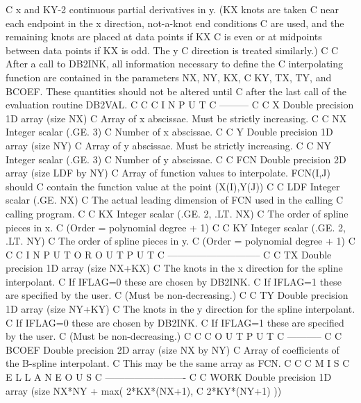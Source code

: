 \documentclass[11pt,twoside,nolof]{starlink}
\begin{document}
\begin{terminalv}
C   x and KY-2 continuous partial derivatives in y. (KX knots are taken
C   near each endpoint in the x direction,  not-a-knot  end  conditions
C   are used, and the remaining knots are placed at data points  if  KX
C   is even or at midpoints between data points if KX  is  odd.  The  y
C   direction is treated similarly.)
C
C   After a call to DB2INK, all information  necessary  to  define  the
C   interpolating function are contained in the parameters NX, NY,  KX,
C   KY, TX, TY, and BCOEF. These quantities should not be altered until
C   after the last call of the evaluation routine DB2VAL.
C
C
C   I N P U T
C   ---------
C
C   X       Double precision 1D array (size NX)
C           Array of x abscissae. Must be strictly increasing.
C
C   NX      Integer scalar (.GE. 3)
C           Number of x abscissae.
C
C   Y       Double precision 1D array (size NY)
C           Array of y abscissae. Must be strictly increasing.
C
C   NY      Integer scalar (.GE. 3)
C           Number of y abscissae.
C
C   FCN     Double precision 2D array (size LDF by NY)
C           Array of function values to interpolate. FCN(I,J) should
C           contain the function value at the point (X(I),Y(J))
C
C   LDF     Integer scalar (.GE. NX)
C           The actual leading dimension of FCN used in the calling
C           calling program.
C
C   KX      Integer scalar (.GE. 2, .LT. NX)
C           The order of spline pieces in x.
C           (Order = polynomial degree + 1)
C
C   KY      Integer scalar (.GE. 2, .LT. NY)
C           The order of spline pieces in y.
C           (Order = polynomial degree + 1)
C
C
C   I N P U T   O R   O U T P U T
C   -----------------------------
C
C   TX      Double precision 1D array (size NX+KX)
C           The knots in the x direction for the spline interpolant.
C           If IFLAG=0 these are chosen by DB2INK.
C           If IFLAG=1 these are specified by the user.
C                      (Must be non-decreasing.)
C
C   TY      Double precision 1D array (size NY+KY)
C           The knots in the y direction for the spline interpolant.
C           If IFLAG=0 these are chosen by DB2INK.
C           If IFLAG=1 these are specified by the user.
C                      (Must be non-decreasing.)
C
C
C   O U T P U T
C   -----------
C
C   BCOEF   Double precision 2D array (size NX by NY)
C           Array of coefficients of the B-spline interpolant.
C           This may be the same array as FCN.
C
C
C   M I S C E L L A N E O U S
C   -------------------------
C
C   WORK    Double precision 1D array (size NX*NY + max( 2*KX*(NX+1),
C                                             2*KY*(NY+1) ))

\end{terminalv}
\end{document}

